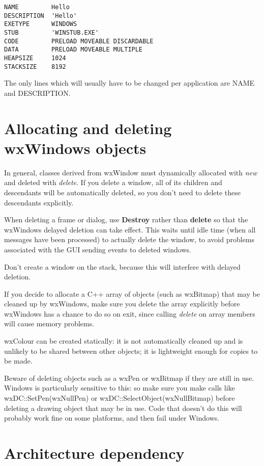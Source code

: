 \begin{verbatim}
NAME         Hello
DESCRIPTION  'Hello'
EXETYPE      WINDOWS
STUB         'WINSTUB.EXE'
CODE         PRELOAD MOVEABLE DISCARDABLE
DATA         PRELOAD MOVEABLE MULTIPLE
HEAPSIZE     1024
STACKSIZE    8192
\end{verbatim}

The only lines which will usually have to be changed per application are
NAME and DESCRIPTION.

\section{Allocating and deleting wxWindows objects}

In general, classes derived from wxWindow must dynamically allocated
with {\it new} and deleted with {\it delete}. If you delete a window,
all of its children and descendants will be automatically deleted,
so you don't need to delete these descendants explicitly.

When deleting a frame or dialog, use {\bf Destroy} rather than {\bf delete} so
that the wxWindows delayed deletion can take effect. This waits until idle time
(when all messages have been processed) to actually delete the window, to avoid
problems associated with the GUI sending events to deleted windows.

Don't create a window on the stack, because this will interfere
with delayed deletion.

If you decide to allocate a C++ array of objects (such as wxBitmap) that may
be cleaned up by wxWindows, make sure you delete the array explicitly
before wxWindows has a chance to do so on exit, since calling {\it delete} on
array members will cause memory problems.

wxColour can be created statically: it is not automatically cleaned
up and is unlikely to be shared between other objects; it is lightweight
enough for copies to be made.

Beware of deleting objects such as a wxPen or wxBitmap if they are still in use.
Windows is particularly sensitive to this: so make sure you
make calls like wxDC::SetPen(wxNullPen) or wxDC::SelectObject(wxNullBitmap) before deleting
a drawing object that may be in use. Code that doesn't do this will probably work
fine on some platforms, and then fail under Windows.

\section{Architecture dependency}

